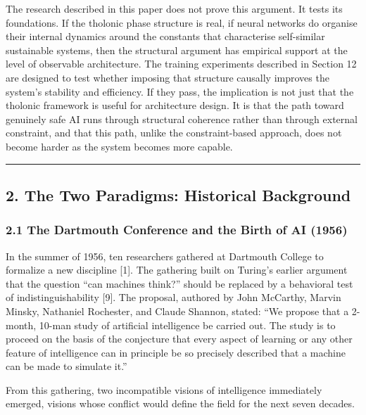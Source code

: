 \documentclass[
  11pt,
  letterpaper,
]{article}
\begin{document}
The research described in this paper does not prove this argument. It
tests its foundations. If the tholonic phase structure is real, if
neural networks do organise their internal dynamics around the constants
that characterise self-similar sustainable systems, then the structural
argument has empirical support at the level of observable architecture.
The training experiments described in Section 12 are designed to test
whether imposing that structure causally improves the system's stability
and efficiency. If they pass, the implication is not just that the
tholonic framework is useful for architecture design. It is that the
path toward genuinely safe AI runs through structural coherence rather
than through external constraint, and that this path, unlike the
constraint-based approach, does not become harder as the system becomes
more capable.

\begin{center}\rule{0.5\linewidth}{0.5pt}\end{center}

\subsection{2. The Two Paradigms: Historical
Background}\label{the-two-paradigms-historical-background}

\subsubsection{2.1 The Dartmouth Conference and the Birth of AI
(1956)}\label{the-dartmouth-conference-and-the-birth-of-ai-1956}

In the summer of 1956, ten researchers gathered at Dartmouth College to
formalize a new discipline {[}1{]}. The gathering built on Turing's
earlier argument that the question ``can machines think?'' should be
replaced by a behavioral test of indistinguishability {[}9{]}. The
proposal, authored by John McCarthy, Marvin Minsky, Nathaniel Rochester,
and Claude Shannon, stated: ``We propose that a 2-month, 10-man study of
artificial intelligence be carried out. The study is to proceed on the
basis of the conjecture that every aspect of learning or any other
feature of intelligence can in principle be so precisely described that
a machine can be made to simulate it.''

From this gathering, two incompatible visions of intelligence
immediately emerged, visions whose conflict would define the field for
the next seven decades.
\end{document}
